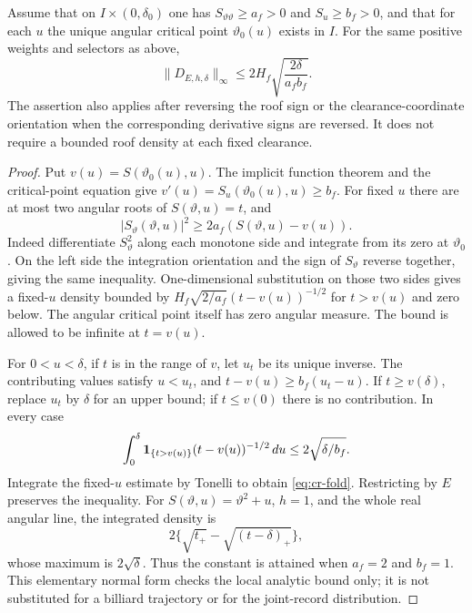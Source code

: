 \begin{theorem}
\label{thm:cr-fold}
Assume that on $I\times(0,\delta_0)$ one has
$S_{\vartheta\vartheta}\ge a_f>0$ and $S_u\ge b_f>0$, and that
for each $u$ the unique angular critical point
$\vartheta_0(u)$ exists in $I$. For the same positive weights and
selectors as above,
\begin{equation}\label{eq:cr-fold}
 \|D_{E,h,\delta}\|_\infty
                 \le 2H_f\sqrt{\frac{2\delta}{a_fb_f}}.
\end{equation}
The assertion also applies after reversing the roof sign or the
clearance-coordinate orientation when the corresponding derivative
signs are reversed. It does not require a bounded roof density at
each fixed clearance.
\end{theorem}
\begin{proof}
Put $v(u)=S(\vartheta_0(u),u)$. The implicit function theorem and
the critical-point equation give $v'(u)=S_u(\vartheta_0(u),u)
\ge b_f$. For fixed $u$ there are at most two angular roots of
$S(\vartheta,u)=t$, and
\[
 |S_\vartheta(\vartheta,u)|^2
                \ge2a_f(S(\vartheta,u)-v(u)).
\]
Indeed differentiate $S_\vartheta^2$ along each monotone side and
integrate from its zero at $\vartheta_0$. On the left side the
integration orientation and the sign of $S_\vartheta$ reverse
together, giving the same inequality. One-dimensional substitution
on those two sides gives a fixed-$u$ density bounded by
$H_f\sqrt{2/a_f}(t-v(u))^{-1/2}$ for $t>v(u)$ and zero below.
The angular critical point itself has zero angular measure. The
bound is allowed to be infinite at $t=v(u)$.

For $0<u<\delta$, if $t$ is in the range of $v$, let $u_t$ be its
unique inverse. The contributing values satisfy $u<u_t$, and
$t-v(u)\ge b_f(u_t-u)$. If $t\ge v(\delta)$, replace $u_t$
by $\delta$ for an upper bound; if $t\le v(0)$ there is no
contribution. In every case
\[
 \int_0^\delta\mathbf1_{\{t>v(u)\}}
                     (t-v(u))^{-1/2}\,du
                         \le2\sqrt{\delta/b_f}.
\]
Integrate the fixed-$u$ estimate by Tonelli to obtain
\eqref{eq:cr-fold}. Restricting by $E$ preserves the inequality.
For $S(\vartheta,u)=\vartheta^2+u$, $h=1$, and the whole real
angular line, the integrated density is
\[
 2\{\sqrt{t_+}-\sqrt{(t-\delta)_+}\},
\]
whose maximum is $2\sqrt\delta$. Thus the constant is attained
when $a_f=2$ and $b_f=1$. This elementary normal form checks the
local analytic bound only; it is not substituted for a billiard
trajectory or for the joint-record distribution.
\end{proof}

